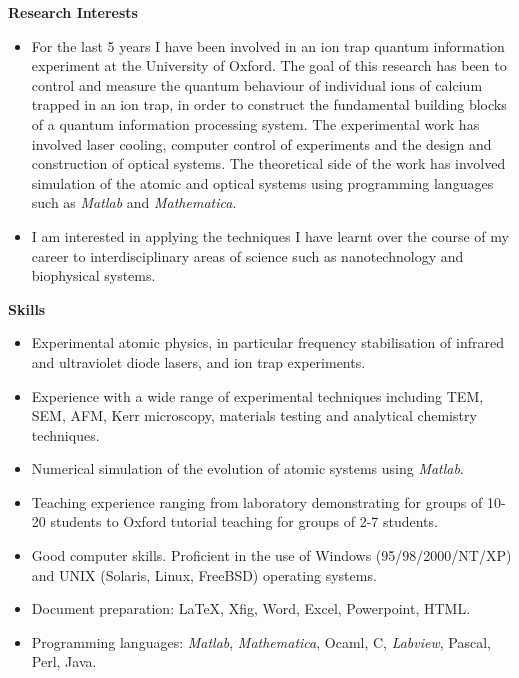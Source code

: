 \documentclass[10pt,a4paper]{article}
\begin{document}
{\large \textbf{Research Interests}}
\begin{itemize}
\item For the last 5 years I have been involved in an ion trap quantum
  information experiment at the University of Oxford.  The goal of
  this research has been to control and measure the quantum behaviour
  of individual ions of calcium trapped in an ion trap, in order to
  construct the fundamental building blocks of a quantum information
  processing system.  The experimental work has involved laser
  cooling, computer control of experiments and the design and
  construction of optical systems.  The theoretical side of the work
  has involved simulation of the atomic and optical systems using
  programming languages such as \textit{Matlab} and \textit{Mathematica}. 
\item I am interested in applying the techniques I have learnt over
  the course of my career to interdisciplinary areas of science 
  such as nanotechnology and biophysical systems.
\end{itemize}

{\large \textbf{Skills}}
\begin{itemize}
  \item Experimental atomic physics, in particular frequency
    stabilisation of infrared and ultraviolet diode lasers, and  
    ion trap experiments. 
  \item Experience with a wide range of experimental techniques including
    TEM, SEM, AFM, Kerr microscopy, materials testing and analytical chemistry
    techniques.
  \item Numerical simulation of the evolution of atomic systems using
    \textit{Matlab}.
   \item Teaching experience ranging from laboratory demonstrating for groups
    of 10-20 students to Oxford tutorial teaching for groups of 
    2-7 students. 
  \item Good computer skills. Proficient in the use of Windows
    (95/98/2000/NT/XP) and UNIX (Solaris, Linux, FreeBSD) operating
    systems.
  \item Document preparation: \LaTeX, Xfig, Word, Excel, Powerpoint,
    HTML.
  \item Programming languages:  \textit{Matlab}, \textit{Mathematica},
    Ocaml, C, \textit{Labview}, Pascal, Perl, Java.
\end{itemize}

\end{document}
